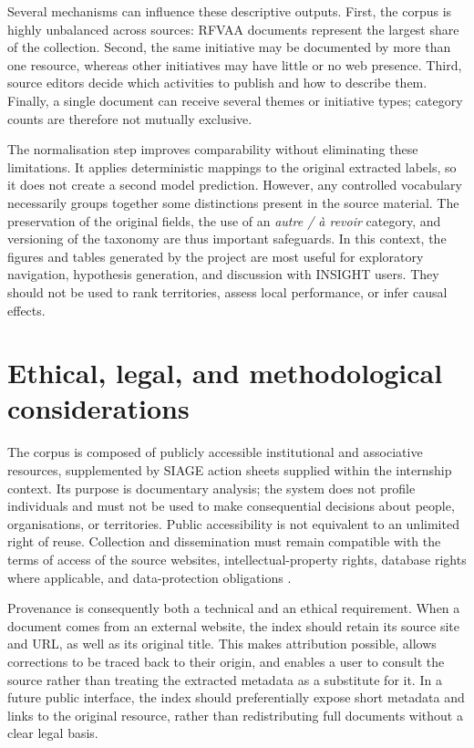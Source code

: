 \documentclass[
11pt,
english,
singlespacing,
headsepline,
]{MastersDoctoralThesis}
\begin{document}
Several mechanisms can influence these descriptive outputs. First, the corpus
is highly unbalanced across sources: RFVAA documents represent the largest
share of the collection. Second, the same initiative may be documented by more
than one resource, whereas other initiatives may have little or no web
presence. Third, source editors decide which activities to publish and how to
describe them. Finally, a single document can receive several themes or
initiative types; category counts are therefore not mutually exclusive.

The normalisation step improves comparability without eliminating these
limitations. It applies deterministic mappings to the original extracted
labels, so it does not create a second model prediction. However, any
controlled vocabulary necessarily groups together some distinctions present in
the source material. The preservation of the original fields, the use of an
\textit{autre / \`a revoir} category, and versioning of the taxonomy are thus
important safeguards. In this context, the figures and tables generated by the
project are most useful for exploratory navigation, hypothesis generation, and
discussion with INSIGHT users. They should not be used to rank territories,
assess local performance, or infer causal effects.

\section{Ethical, legal, and methodological considerations}

The corpus is composed of publicly accessible institutional and associative
resources, supplemented by SIAGE action sheets supplied within the internship
context. Its purpose is documentary analysis; the system does not profile
individuals and must not be used to make consequential decisions about people,
organisations, or territories. Public accessibility is not equivalent to an
unlimited right of reuse. Collection and dissemination must remain compatible
with the terms of access of the source websites, intellectual-property rights,
database rights where applicable, and data-protection obligations
\cite{cnil2024reuse}.

Provenance is consequently both a technical and an ethical requirement. When a
document comes from an external website, the index should retain its source
site and URL, as well as its original title. This makes attribution possible,
allows corrections to be traced back to their origin, and enables a user to
consult the source rather than treating the extracted metadata as a substitute
for it. In a future public interface, the index should preferentially expose
short metadata and links to the original resource, rather than redistributing
full documents without a clear legal basis.
\end{document}
